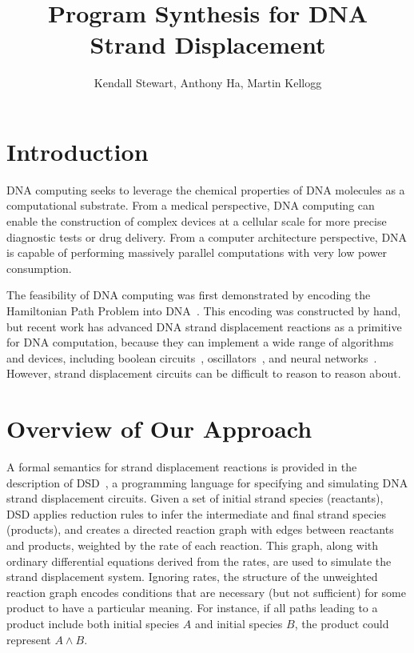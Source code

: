 \documentclass{article}[10pt]
\begin{document}
\title{Program Synthesis for DNA Strand Displacement}
\author{Kendall Stewart, Anthony Ha, Martin Kellogg}
\date{\vspace{-5ex}}

\maketitle

\section{Introduction}

DNA computing seeks to leverage the chemical properties
of DNA molecules as a computational substrate.
From a medical perspective, DNA computing can enable the
construction of complex devices at a cellular scale for more precise
diagnostic tests or drug delivery. From a computer architecture perspective,
DNA is capable of performing massively parallel computations with very low
power consumption.

The feasibility of DNA computing was first demonstrated by encoding the
Hamiltonian Path Problem into DNA~\cite{adelman}. This encoding was constructed
by hand, but recent work has advanced DNA strand displacement reactions as a
primitive for DNA computation, because they can implement a wide
range of algorithms and devices, including boolean circuits~\cite{strands},
oscillators~\cite{dsd}, and neural networks~\cite{strandnn}.
However, strand displacement circuits can be difficult to reason
to reason about.

\section{Overview of Our Approach}

A formal semantics for strand displacement reactions is provided in the
description of DSD~\cite{dsd}, a programming language for specifying and
simulating DNA strand displacement circuits. Given a set of initial strand
species (reactants), DSD applies reduction rules to infer the intermediate and
final strand species (products), and creates a directed reaction graph with
edges between reactants and products, weighted by the rate of each reaction.
This graph, along with ordinary differential equations derived from the rates,
are used to simulate the strand displacement system.
Ignoring rates, the structure of the unweighted reaction graph encodes
conditions that are necessary (but not sufficient) for some product to have a
particular meaning. For instance, if all paths leading to a product include both
initial species $A$ and initial species $B$, the product could
represent $A \land B$.
\end{document}
